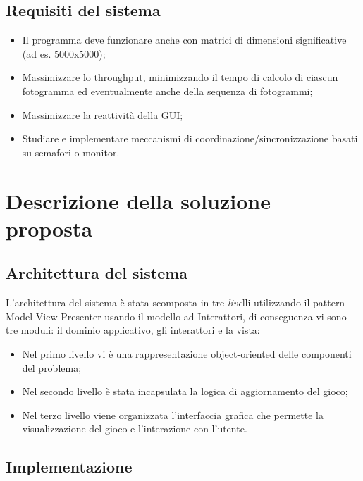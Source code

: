 \documentclass[a4paper]{article}
\begin{document}
\subsection{Requisiti del sistema}\label{requisiti-del-sistema}

\begin{itemize}
\item
  Il programma deve funzionare anche con matrici di dimensioni significative (ad es. 5000x5000);
\item
  Massimizzare lo throughput, minimizzando il tempo di calcolo di ciascun fotogramma ed eventualmente anche della sequenza di fotogrammi;
\item
  Massimizzare la reattività della GUI;
\item
  Studiare e implementare meccanismi di coordinazione/sincronizzazione basati su semafori o monitor.
\end{itemize}

\section{Descrizione della soluzione
proposta}\label{descrizione-della-soluzione-proposta}

\subsection{Architettura del sistema}\label{architettura-del-sistema}

L'architettura del sistema è stata scomposta in tre \emph{live}lli utilizzando il pattern Model View Presenter usando il modello ad Interattori, di conseguenza vi sono tre moduli: il dominio applicativo, gli interattori e la vista:

\begin{itemize}
\item
  Nel primo livello vi è una rappresentazione object-oriented delle componenti del problema;
\item
  Nel secondo livello è stata incapsulata la logica di aggiornamento del gioco;
\item
  Nel terzo livello viene organizzata l'interfaccia grafica che permette la visualizzazione del gioco e l'interazione con l'utente.
\end{itemize}

\subsection{Implementazione}\label{implementazione}
\end{document}
